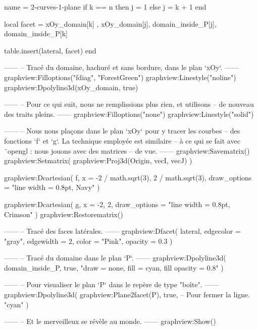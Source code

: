 \documentclass[border = 3pt]{standalone}
\begin{document}
\begin{luadraw*}{name = 2-curves-1-plane}
  if k == n then
    j = 1
  else
    j = k + 1
  end

  local facet = {
    xOy_domain[k]     , xOy_domain[j],
    domain_inside_P[j], domain_inside_P[k]
  }

  table.insert(lateral, facet)
end

------
-- Tracé du domaine, hachuré et sans bordure, dans le plan `xOy`.
------
graphview:Filloptions("fdiag", "ForestGreen")
graphview:Linestyle("noline")
graphview:Dpolyline3d(xOy_domain, true)

------
-- Pour ce qui suit, nous ne remplissions plus rien, et utilisons
-- de nouveau des traits pleins.
------
graphview:Filloptions("none")
graphview:Linestyle("solid")

------
-- Nous nous plaçons dans le plan `xOy` pour y tracer les courbes
-- des fonctions  `f` et `g`. La technique employée est similaire
-- à ce qui se fait avec ¨opengl : nous jouons avec des matrices
-- de vue.
------
graphview:Savematrix()
  graphview:Setmatrix(
    graphview:Proj3d({Origin, vecI, vecJ})
  )

  graphview:Dcartesian(
    f,
    {
      x = {-2 / math.sqrt(3), 2 / math.sqrt(3)},
      draw_options = "line width = 0.8pt, Navy"
    }
  )

  graphview:Dcartesian(
    g,
    {
      x = {-2, 2},
      draw_options = "line width = 0.8pt, Crimson"
    }
  )
graphview:Restorematrix()

------
-- Tracé des faces latérales.
------
graphview:Dfacet(
  lateral,
  {
    edgecolor = "gray",
    edgewidth = 2,
    color     = "Pink",
    opacity   = 0.3
  }
)

------
-- Tracé du domaine dans le plan `P`.
------
graphview:Dpolyline3d(
  domain_inside_P,
  true,
  "draw = none, fill = cyan, fill opacity = 0.8"
)

------
-- Pour visualiser le plan `P` dans le repère de type "boîte".
------
graphview:Dpolyline3d(
  graphview:Plane2facet(P),
  true,   -- Pour fermer la ligne.
  "cyan"
)

------
-- Et le merveilleux se révèle au monde.
------
graphview:Show()
\end{luadraw*}
\end{document}
